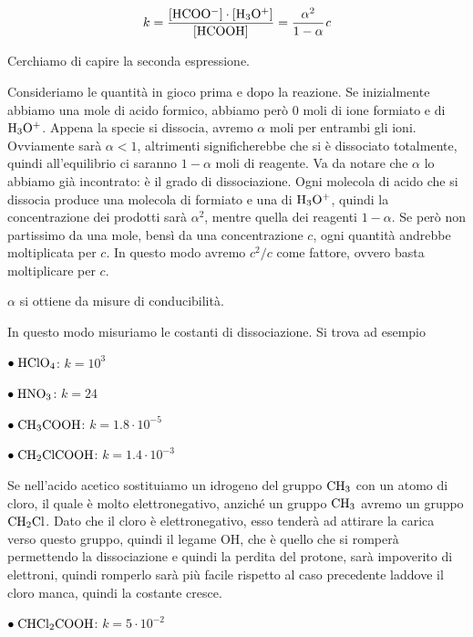 $$k= \rm{\frac{[HCOO^-]\cdot[H_3O^+]}{[HCOOH]}} = \frac{\alpha^2}{1- \alpha}\textit{c}$$

Cerchiamo di capire la seconda espressione.

Consideriamo le quantità in gioco prima e dopo la reazione. Se inizialmente abbiamo una mole di acido formico, abbiamo però 0 moli di ione formiato e di $\rm H_3O^+$. Appena la specie si dissocia, avremo $\alpha$ moli per entrambi gli ioni. Ovviamente sarà $\alpha<1$, altrimenti significherebbe che si è dissociato totalmente, quindi all'equilibrio ci saranno $1-\alpha$ moli di reagente. Va da notare che $\alpha$ lo abbiamo già incontrato: è il grado di dissociazione. Ogni molecola di acido che si dissocia produce una molecola di formiato e una di $\rm H_3O^+$, quindi la concentrazione dei prodotti sarà $\alpha^2$, mentre quella dei reagenti $1-\alpha$. Se però non partissimo da una mole, bensì da una concentrazione $c$, ogni quantità andrebbe moltiplicata per $c$. In questo modo avremo $c^2/c$ come fattore, ovvero basta moltiplicare per $c$.

$\alpha$ si ottiene da misure di conducibilità.

In questo modo misuriamo le costanti di dissociazione. Si trova ad esempio

\vspace{0.2cm}$\bullet \; \rm HClO_4$: $k=10^3$

\vspace{0.2cm}$\bullet \; \rm HNO_3$: $k=24$

\vspace{0.2cm}$\bullet \; \rm CH_3COOH$: $k=1.8 \cdot 10^{-5}$

\vspace{0.2cm}$\bullet \; \rm CH_2ClCOOH$: $k=1.4 \cdot 10^{-3}$

\vspace{0.2cm}Se nell'acido acetico sostituiamo un idrogeno del gruppo $\rm CH_3$ con un atomo di cloro, il quale è molto elettronegativo, anziché un gruppo $\rm CH_3$ avremo un gruppo $\rm CH_2Cl$. Dato che il cloro è elettronegativo, esso tenderà ad attirare la carica verso questo gruppo, quindi il legame OH, che è quello che si romperà permettendo la dissociazione e quindi la perdita del protone, sarà impoverito di elettroni, quindi romperlo sarà più facile rispetto al caso precedente laddove il cloro manca, quindi la costante cresce.

\vspace{0.2cm}$\bullet \; \rm CHCl_2COOH$: $k=5 \cdot 10^{-2}$

